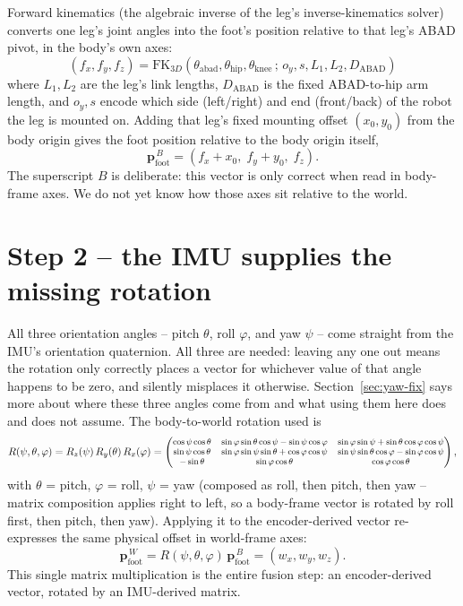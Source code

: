 \documentclass[11pt]{article}
\begin{document}
Forward kinematics (the algebraic inverse of the leg's inverse-kinematics
solver) converts one leg's joint angles into the foot's position relative
to that leg's ABAD pivot, in the body's own axes:
\begin{equation}
(f_x, f_y, f_z) = \text{FK}_{3D}(\theta_{\text{abad}}, \theta_{\text{hip}}, \theta_{\text{knee}} \,;\, o_y, s, L_1, L_2, D_{\text{ABAD}})
\end{equation}
where $L_1, L_2$ are the leg's link lengths, $D_{\text{ABAD}}$ is the fixed
ABAD-to-hip arm length, and $o_y, s$ encode which side (left/right) and end
(front/back) of the robot the leg is mounted on. Adding that leg's fixed
mounting offset $(x_0, y_0)$ from the body origin gives the foot position
relative to the body origin itself,
\begin{equation}
\mathbf{p}_{\text{foot}}^{\,B} = (f_x + x_0,\; f_y + y_0,\; f_z).
\end{equation}
The superscript $B$ is deliberate: this vector is only correct when read in
body-frame axes. We do not yet know how those axes sit relative to the
world.

\section{Step 2 -- the IMU supplies the missing rotation}

All three orientation angles -- pitch $\theta$, roll $\varphi$, and yaw
$\psi$ -- come straight from the IMU's orientation quaternion. All three are
needed: leaving any one out means the rotation only correctly places a
vector for whichever value of that angle happens to be zero, and silently
misplaces it otherwise. Section~\ref{sec:yaw-fix} says more about where
these three angles come from and what using them here does and does not
assume. The body-to-world rotation used is
\begin{equation}
R(\psi, \theta, \varphi) = R_z(\psi)\,R_y(\theta)\, R_x(\varphi) =
\footnotesize
\begin{pmatrix}
\cos\psi\cos\theta & \sin\varphi\sin\theta\cos\psi - \sin\psi\cos\varphi & \sin\varphi\sin\psi + \sin\theta\cos\varphi\cos\psi \\
\sin\psi\cos\theta & \sin\varphi\sin\psi\sin\theta + \cos\varphi\cos\psi & \sin\psi\sin\theta\cos\varphi - \sin\varphi\cos\psi \\
-\sin\theta & \sin\varphi\cos\theta & \cos\varphi\cos\theta
\end{pmatrix}
\normalsize,
\label{eq:R-full}
\end{equation}
with $\theta$ = pitch, $\varphi$ = roll, $\psi$ = yaw (composed as roll,
then pitch, then yaw -- matrix composition applies right to left, so a
body-frame vector is rotated by roll first, then pitch, then yaw). Applying
it to the encoder-derived vector re-expresses the same physical offset in
world-frame axes:
\begin{equation}
\mathbf{p}_{\text{foot}}^{\,W} = R(\psi,\theta,\varphi)\,\mathbf{p}_{\text{foot}}^{\,B}
= (w_x, w_y, w_z).
\end{equation}
This single matrix multiplication is the entire fusion step: an
encoder-derived vector, rotated by an IMU-derived matrix.
\end{document}

